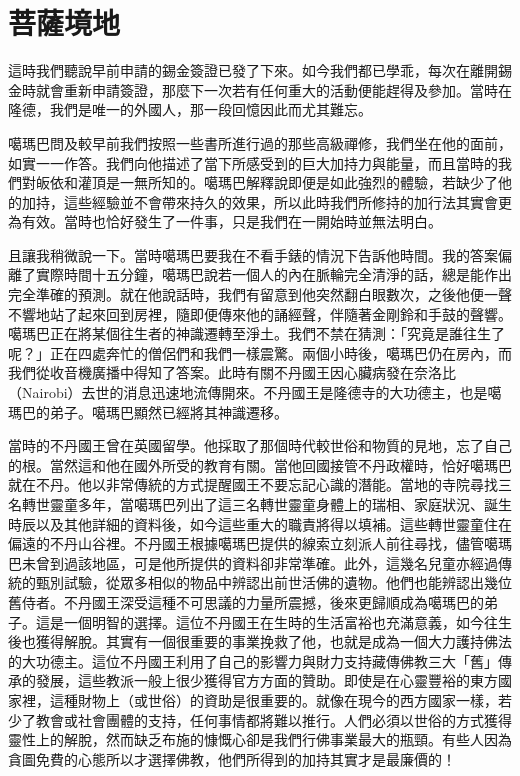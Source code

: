 \chapter{菩薩境地}

這時我們聽說早前申請的錫金簽證已發了下來。如今我們都已學乖，每次在離開錫金時就會重新申請簽證，那麼下一次若有任何重大的活動便能趕得及參加。當時在隆德，我們是唯一的外國人，那一段回憶因此而尤其難忘。

噶瑪巴問及較早前我們按照一些書所進行過的那些高級禪修，我們坐在他的面前，如實一一作答。我們向他描述了當下所感受到的巨大加持力與能量，而且當時的我們對皈依和灌頂是一無所知的。噶瑪巴解釋說即便是如此強烈的體驗，若缺少了他的加持，這些經驗並不會帶來持久的效果，所以此時我們所修持的加行法其實會更為有效。當時也恰好發生了一件事，只是我們在一開始時並無法明白。

且讓我稍微說一下。當時噶瑪巴要我在不看手錶的情況下告訴他時間。我的答案偏離了實際時間十五分鐘，噶瑪巴說若一個人的內在脈輪完全清淨的話，總是能作出完全準確的預測。就在他說話時，我們有留意到他突然翻白眼數次，之後他便一聲不響地站了起來回到房裡，隨即便傳來他的誦經聲，伴隨著金剛鈴和手鼓的聲響。噶瑪巴正在將某個往生者的神識遷轉至淨土。我們不禁在猜測：「究竟是誰往生了呢？」正在四處奔忙的僧侶們和我們一樣震驚。兩個小時後，噶瑪巴仍在房內，而我們從收音機廣播中得知了答案。此時有關不丹國王因心臟病發在奈洛比（Nairobi）去世的消息迅速地流傳開來。不丹國王是隆德寺的大功德主，也是噶瑪巴的弟子。噶瑪巴顯然已經將其神識遷移。

當時的不丹國王曾在英國留學。他採取了那個時代較世俗和物質的見地，忘了自己的根。當然這和他在國外所受的教育有關。當他回國接管不丹政權時，恰好噶瑪巴就在不丹。他以非常傳統的方式提醒國王不要忘記心識的潛能。當地的寺院尋找三名轉世靈童多年，當噶瑪巴列出了這三名轉世靈童身體上的瑞相、家庭狀況、誕生時辰以及其他詳細的資料後，如今這些重大的職責將得以填補。這些轉世靈童住在偏遠的不丹山谷裡。不丹國王根據噶瑪巴提供的線索立刻派人前往尋找，儘管噶瑪巴未曾到過該地區，可是他所提供的資料卻非常準確。此外，這幾名兒童亦經過傳統的甄別試驗，從眾多相似的物品中辨認出前世活佛的遺物。他們也能辨認出幾位舊侍者。不丹國王深受這種不可思議的力量所震撼，後來更歸順成為噶瑪巴的弟子。這是一個明智的選擇。這位不丹國王在生時的生活富裕也充滿意義，如今往生後也獲得解脫。其實有一個很重要的事業挽救了他，也就是成為一個大力護持佛法的大功德主。這位不丹國王利用了自己的影響力與財力支持藏傳佛教三大「舊」傳承的發展，這些教派一般上很少獲得官方方面的贊助。即使是在心靈豐裕的東方國家裡，這種財物上（或世俗）的資助是很重要的。就像在現今的西方國家一樣，若少了教會或社會團體的支持，任何事情都將難以推行。人們必須以世俗的方式獲得靈性上的解脫，然而缺乏布施的慷慨心卻是我們行佛事業最大的瓶頸。有些人因為貪圖免費的心態所以才選擇佛教，他們所得到的加持其實才是最廉價的！


